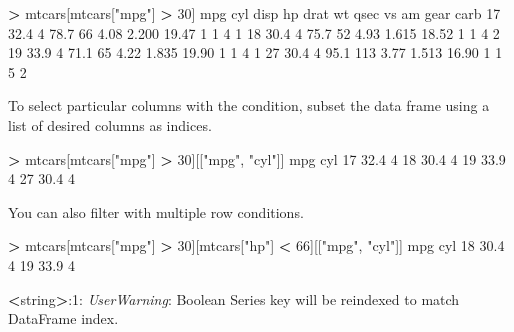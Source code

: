 \documentclass[
]{book}
\newenvironment{Shaded}{\begin{snugshade}}{\end{snugshade}}
\newcommand{\DecValTok}[1]{\textcolor[rgb]{0.00,0.00,0.81}{#1}}
\newcommand{\FloatTok}[1]{\textcolor[rgb]{0.00,0.00,0.81}{#1}}
\newcommand{\NormalTok}[1]{#1}
\newcommand{\OperatorTok}[1]{\textcolor[rgb]{0.81,0.36,0.00}{\textbf{#1}}}
\newcommand{\PreprocessorTok}[1]{\textcolor[rgb]{0.56,0.35,0.01}{\textit{#1}}}
\newcommand{\StringTok}[1]{\textcolor[rgb]{0.31,0.60,0.02}{#1}}
\begin{document}
\begin{Shaded}
\begin{Highlighting}[]
\OperatorTok{\textgreater{}}\NormalTok{ mtcars[mtcars[}\StringTok{"mpg"}\NormalTok{] }\OperatorTok{\textgreater{}} \DecValTok{30}\NormalTok{]}
\NormalTok{     mpg  cyl  disp   hp  drat     wt   qsec  vs  am  gear  carb}
\DecValTok{17}  \FloatTok{32.4}    \DecValTok{4}  \FloatTok{78.7}   \DecValTok{66}  \FloatTok{4.08}  \FloatTok{2.200}  \FloatTok{19.47}   \DecValTok{1}   \DecValTok{1}     \DecValTok{4}     \DecValTok{1}
\DecValTok{18}  \FloatTok{30.4}    \DecValTok{4}  \FloatTok{75.7}   \DecValTok{52}  \FloatTok{4.93}  \FloatTok{1.615}  \FloatTok{18.52}   \DecValTok{1}   \DecValTok{1}     \DecValTok{4}     \DecValTok{2}
\DecValTok{19}  \FloatTok{33.9}    \DecValTok{4}  \FloatTok{71.1}   \DecValTok{65}  \FloatTok{4.22}  \FloatTok{1.835}  \FloatTok{19.90}   \DecValTok{1}   \DecValTok{1}     \DecValTok{4}     \DecValTok{1}
\DecValTok{27}  \FloatTok{30.4}    \DecValTok{4}  \FloatTok{95.1}  \DecValTok{113}  \FloatTok{3.77}  \FloatTok{1.513}  \FloatTok{16.90}   \DecValTok{1}   \DecValTok{1}     \DecValTok{5}     \DecValTok{2}
\end{Highlighting}
\end{Shaded}

To select particular columns with the condition, subset the data frame using a list of desired columns as indices.

\begin{Shaded}
\begin{Highlighting}[]
\OperatorTok{\textgreater{}}\NormalTok{ mtcars[mtcars[}\StringTok{"mpg"}\NormalTok{] }\OperatorTok{\textgreater{}} \DecValTok{30}\NormalTok{][[}\StringTok{"mpg"}\NormalTok{, }\StringTok{"cyl"}\NormalTok{]]}
\NormalTok{     mpg  cyl}
\DecValTok{17}  \FloatTok{32.4}    \DecValTok{4}
\DecValTok{18}  \FloatTok{30.4}    \DecValTok{4}
\DecValTok{19}  \FloatTok{33.9}    \DecValTok{4}
\DecValTok{27}  \FloatTok{30.4}    \DecValTok{4}
\end{Highlighting}
\end{Shaded}

You can also filter with multiple row conditions.

\begin{Shaded}
\begin{Highlighting}[]
\OperatorTok{\textgreater{}}\NormalTok{ mtcars[mtcars[}\StringTok{"mpg"}\NormalTok{] }\OperatorTok{\textgreater{}} \DecValTok{30}\NormalTok{][mtcars[}\StringTok{"hp"}\NormalTok{] }\OperatorTok{\textless{}} \DecValTok{66}\NormalTok{][[}\StringTok{"mpg"}\NormalTok{, }\StringTok{"cyl"}\NormalTok{]]}
\NormalTok{     mpg  cyl}
\DecValTok{18}  \FloatTok{30.4}    \DecValTok{4}
\DecValTok{19}  \FloatTok{33.9}    \DecValTok{4}

\OperatorTok{\textless{}}\NormalTok{string}\OperatorTok{\textgreater{}}\NormalTok{:}\DecValTok{1}\NormalTok{: }\PreprocessorTok{UserWarning}\NormalTok{: Boolean Series key will be reindexed to match DataFrame index.}
\end{Highlighting}
\end{Shaded}
\end{document}
